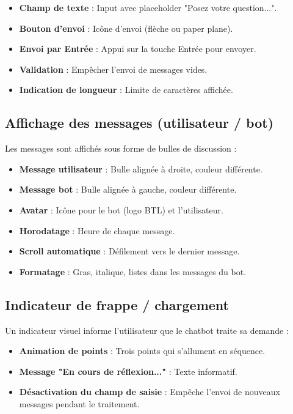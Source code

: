 \begin{itemize}
    \item \textbf{Champ de texte} : Input avec placeholder "Posez votre question...".
    \item \textbf{Bouton d'envoi} : Icône d'envoi (flèche ou paper plane).
    \item \textbf{Envoi par Entrée} : Appui sur la touche Entrée pour envoyer.
    \item \textbf{Validation} : Empêcher l'envoi de messages vides.
    \item \textbf{Indication de longueur} : Limite de caractères affichée.
\end{itemize}

\subsection{Affichage des messages (utilisateur / bot)}

Les messages sont affichés sous forme de bulles de discussion :

\begin{itemize}
    \item \textbf{Message utilisateur} : Bulle alignée à droite, couleur différente.
    \item \textbf{Message bot} : Bulle alignée à gauche, couleur différente.
    \item \textbf{Avatar} : Icône pour le bot (logo BTL) et l'utilisateur.
    \item \textbf{Horodatage} : Heure de chaque message.
    \item \textbf{Scroll automatique} : Défilement vers le dernier message.
    \item \textbf{Formatage} : Gras, italique, listes dans les messages du bot.
\end{itemize}

\subsection{Indicateur de frappe / chargement}

Un indicateur visuel informe l'utilisateur que le chatbot traite sa demande :

\begin{itemize}
    \item \textbf{Animation de points} : Trois points qui s'allument en séquence.
    \item \textbf{Message "En cours de réflexion..."} : Texte informatif.
    \item \textbf{Désactivation du champ de saisie} : Empêche l'envoi de nouveaux messages pendant le traitement.
\end{itemize}

